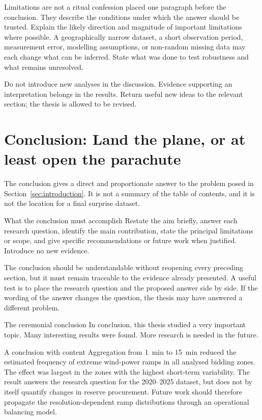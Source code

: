 \documentclass[masters,en,listoffigures,listoftables,acronyms]{NMBU}
\begin{document}
Limitations are not a ritual confession placed one paragraph before the
conclusion. They describe the conditions under which the answer should be
trusted. Explain the likely direction and magnitude of important limitations
where possible. A geographically narrow dataset, a short observation period,
measurement error, modelling assumptions, or non-random missing data may each
change what can be inferred. State what was done to test robustness and what
remains unresolved.

Do not introduce new analyses in the discussion. Evidence supporting an
interpretation belongs in the results. Return useful new ideas to the relevant
section; the thesis is allowed to be revised.

\clearpage
\section{Conclusion: Land the plane, or at least open the parachute}
\label{sec:conclusion}

The conclusion gives a direct and proportionate answer to the problem posed in
Section~\ref{sec:introduction}. It is not a summary of the table of contents,
and it is not the location for a final surprise dataset.

\begin{thesispoint}{What the conclusion must accomplish}
Restate the aim briefly, answer each research question, identify the main
contribution, state the principal limitations or scope, and give specific
recommendations or future work when justified. Introduce no new evidence.
\end{thesispoint}

The conclusion should be understandable without reopening every preceding
section, but it must remain traceable to the evidence already presented. A useful
test is to place the research question and the proposed answer side by side. If
the wording of the answer changes the question, the thesis may have answered a
different problem.

\begin{avoidbox}{The ceremonial conclusion}
In conclusion, this thesis studied a very important topic. Many interesting
results were found. More research is needed in the future.
\end{avoidbox}

\begin{betterbox}{A conclusion with content}
Aggregation from \qty{1}{min} to \qty{15}{min} reduced the estimated frequency
of extreme wind-power ramps in all analysed bidding zones. The effect was
largest in the zones with the highest short-term variability. The result answers
the research question for the 2020--2025 dataset, but does not by itself quantify
changes in reserve procurement. Future work should therefore propagate the
resolution-dependent ramp distributions through an operational balancing model.
\end{betterbox}
\end{document}
